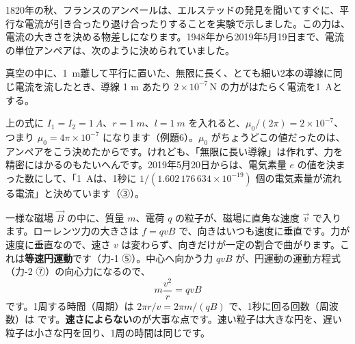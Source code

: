 1820年の秋、フランスのアンペールは、エルステッドの発見を聞いてすぐに、平行な電流が引き合ったり退け合ったりすることを実験で示しました。この力は、電流の大きさを決める物差しになります。1948年から2019年5月19日まで、電流の単位アンペアは、次のように決められていました。
\begin{bkcenter}
\begin{minipage}{0.88\linewidth}\small
真空の中に、\qty{1}{m}離して平行に置いた、無限に長く、とても細い2本の導線に同じ電流を流したとき、導線 1 m あたり $2\times10^{-7}$\,N の力がはたらく電流を\qty{1}{A}とする。
\end{minipage}
\end{bkcenter}
上の式に $I_1=I_2=\qty{1}{A}$、$r=\qty{1}{m}$、$l=\qty{1}{m}$ を入れると、$\mu_0/(2\pi)=2\times10^{-7}$、つまり $\mu_0=4\pi\times10^{-7}$ になります（例題6）。$\mu_0$ がちょうどこの値だったのは、アンペアをこう決めたからです。けれども、「無限に長い導線」は作れず、力を精密にはかるのもたいへんです。2019年5月20日からは、電気素量 $e$ の値を決まった数にして、「\qty{1}{A}は、1秒に $1/(1.602\,176\,634\times10^{-19})$ 個の電気素量が流れる電流」と決めています（③）。

\label{ph:電-6:sec10}
\label{ph:電-6:lorentz}一様な磁場 $\vec B$ の中に、質量 $m$、電荷 $q$ の粒子が、磁場に直角な速度 $\vec v$ で入ります。ローレンツ力の大きさは $f=qvB$ で、向きはいつも速度に垂直です。力が速度に垂直なので、速さ $v$ は変わらず、向きだけが一定の割合で曲がります。これは\textbf{等速円運動}です（力-1 ⑤）。中心へ向かう力 $qvB$ が、円運動の運動方程式（力-2 ⑦）の向心力になるので、
\[m\frac{v^2}{r}=qvB\]
です。1周する時間（周期）は $2\pi r/v=2\pi m/(qB)$ で、1秒に回る回数（周波数）は
です。\textbf{速さによらない}のが大事な点です。速い粒子は大きな円を、遅い粒子は小さな円を回り、1周の時間は同じです。

